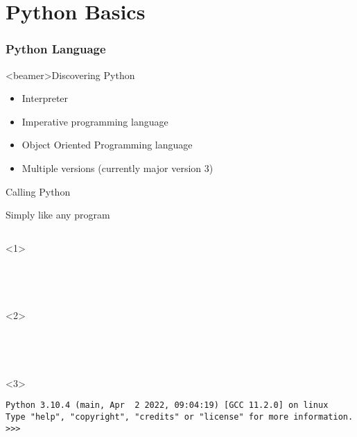 
\part{Python Basics}  %


\section{Python Language}

\begin{frame}<beamer>{Discovering Python}

  \begin{itemize}
    \item<1-> Interpreter~\\
    \item<3-> Imperative programming language
    \item<4-> Object Oriented Programming language
    \item<5-> Multiple versions (currently major version 3)~\\
  \end{itemize}

\end{frame}



\begin{frame}[fragile]{Calling Python}

   Simply like any program

  \begin{columns}[onlytextwidth]
    \begin{column}{\textwidth}
      \begin{onlyenv}<1>
        \begin{lstlisting}[style=sh]
%*\LSTPrompt*)




 \end{lstlisting}
      \end{onlyenv}

      \begin{onlyenv}<2>
        \begin{lstlisting}[style=sh]
%*\LSTPrompt*) python




 \end{lstlisting}
      \end{onlyenv}

      \begin{onlyenv}<3>
        \begin{lstlisting}[style=sh]
%*\LSTPrompt*) python
Python 3.10.4 (main, Apr  2 2022, 09:04:19) [GCC 11.2.0] on linux
Type "help", "copyright", "credits" or "license" for more information.
>>> \end{lstlisting}
      \end{onlyenv}
    \end{column}
  \end{columns}
\end{frame}


